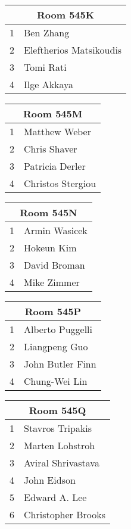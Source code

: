 \documentclass{article}
\begin{document}
\noindent
\begin{tabular}{|l|l|}
\hline
\multicolumn{2}{|c|}{Room 545K} \\ \hline\hline
1&Ben Zhang\\
2&Eleftherios Matsikoudis\\
3&Tomi Rati\\
4&Ilge Akkaya\\

\hline
\end{tabular}
\vspace{1in}

\noindent
\begin{tabular}{|l|l|}
\hline
\multicolumn{2}{|c|}{Room 545M} \\ \hline\hline
1&Matthew Weber\\
2&Chris Shaver\\
3&Patricia Derler\\
4&Christos Stergiou\\

\hline
\end{tabular}
\vspace{1in}

\noindent
\begin{tabular}{|l|l|}
\hline
\multicolumn{2}{|c|}{Room 545N} \\ \hline\hline
1&Armin Wasicek\\
2&Hokeun Kim\\
3&David Broman\\
4&Mike Zimmer\\

\hline
\end{tabular}
\vspace{1in}

\noindent
\begin{tabular}{|l|l|}
\hline
\multicolumn{2}{|c|}{Room 545P} \\ \hline\hline
1&Alberto Puggelli\\
2&Liangpeng Guo\\
3&John Butler Finn\\
4&Chung-Wei Lin\\

\hline
\end{tabular}
\vspace{1in}

\noindent
\begin{tabular}{|l|l|}
\hline
\multicolumn{2}{|c|}{Room 545Q} \\ \hline\hline
1&Stavros Tripakis\\
2&Marten Lohstroh\\
3&Aviral Shrivastava\\
4&John Eidson\\
5&Edward A. Lee\\
6&Christopher Brooks\\

\hline
\end{tabular}
\vspace{1in}
\end{document}
